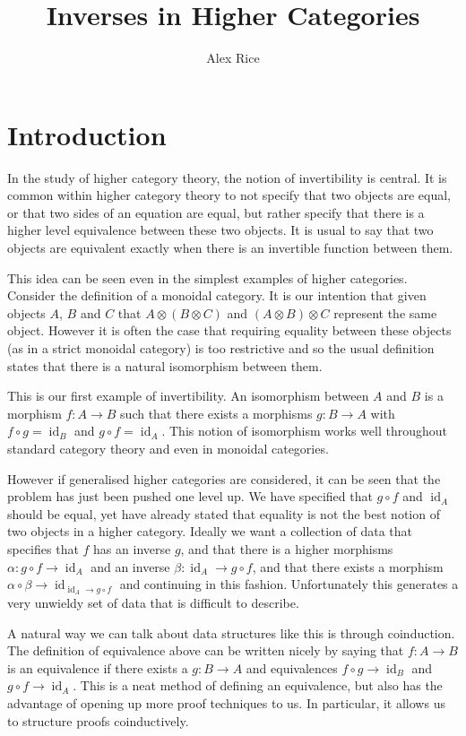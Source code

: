 \documentclass{article}
\title{Inverses in Higher Categories}
\author{Alex Rice}
\theoremstyle{definition}
\theoremstyle{examplestyle}
\DeclareMathOperator{\id}{id}
\begin{document}
\maketitle

\section{Introduction}\label{sec:intro}

In the study of higher category theory, the notion of invertibility is central. It is common within higher category theory to not specify that two objects are equal, or that two sides of an equation are equal, but rather specify that there is a higher level equivalence between these two objects. It is usual to say that two objects are equivalent exactly when there is an invertible function between them.

This idea can be seen even in the simplest examples of higher categories. Consider the definition of a monoidal category. It is our intention that given objects \(A\), \(B\) and \(C\) that \(A \otimes (B \otimes C)\) and \((A \otimes B) \otimes C\) represent the same object. However it is often the case that requiring equality between these objects (as in a strict monoidal category) is too restrictive and so the usual definition states that there is a natural isomorphism between them.

This is our first example of invertibility. An isomorphism between \(A\) and \(B\) is a morphism \(f : A \to B\) such that there exists a morphisms \(g : B \to A\) with \(f \circ g = \id_B\) and \(g \circ f = \id_A\). This notion of isomorphism works well throughout standard category theory and even in monoidal categories.

However if generalised higher categories are considered, it can be seen that the problem has just been pushed one level up. We have specified that \(g \circ f\) and \(\id_A\) should be equal, yet have already stated that equality is not the best notion of two objects in a higher category. Ideally we want a collection of data that specifies that \(f\) has an inverse \(g\), and that there is a higher morphisms \(\alpha : g \circ f \to \id_A\) and an inverse \(\beta : \id_A \to g \circ f\), and that there exists a morphism \(\alpha \circ \beta \to \id_{\id_A \to g \circ f}\) and continuing in this fashion. Unfortunately this generates a very unwieldy set of data that is difficult to describe.

A natural way we can talk about data structures like this is through coinduction. The definition of equivalence above can be written nicely by saying that \(f : A \to B\) is an equivalence if there exists a \(g : B \to A\) and equivalences \(f \circ g \to \id_B\) and \(g \circ f \to \id_A\). This is a neat method of defining an equivalence, but also has the advantage of opening up more proof techniques to us. In particular, it allows us to structure proofs coinductively.
\end{document}

